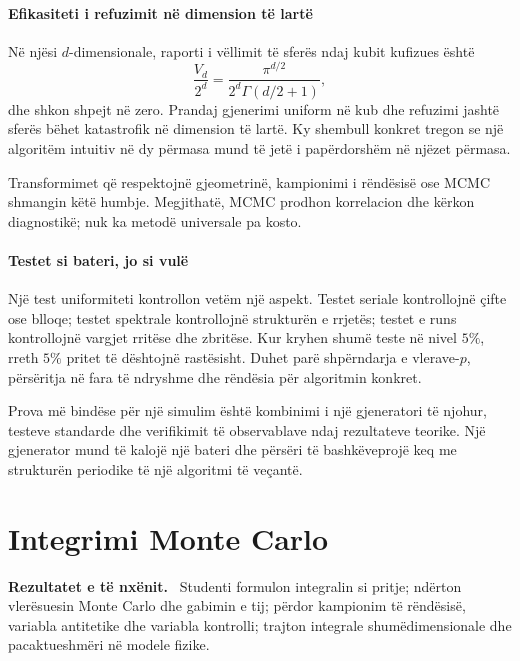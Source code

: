 \documentclass[11pt,oneside,openany]{book}
\newenvironment{qellime}{\par\medskip\noindent\textbf{Rezultatet e të nxënit.}\ }{\par\medskip}
\begin{document}
\subsubsection{Efikasiteti i refuzimit në dimension të lartë}
Në njësi $d$-dimensionale, raporti i vëllimit të sferës ndaj kubit kufizues është
\begin{equation}
 \frac{V_d}{2^d}=\frac{\pi^{d/2}}{2^d\Gamma(d/2+1)},
\end{equation}
dhe shkon shpejt në zero. Prandaj gjenerimi uniform në kub dhe refuzimi jashtë sferës bëhet katastrofik në dimension të lartë. Ky shembull konkret tregon se një algoritëm intuitiv në dy përmasa mund të jetë i papërdorshëm në njëzet përmasa.

Transformimet që respektojnë gjeometrinë, kampionimi i rëndësisë ose MCMC shmangin këtë humbje. Megjithatë, MCMC prodhon korrelacion dhe kërkon diagnostikë; nuk ka metodë universale pa kosto.

\subsubsection{Testet si bateri, jo si vulë}
Një test uniformiteti kontrollon vetëm një aspekt. Testet seriale kontrollojnë çifte ose blloqe; testet spektrale kontrollojnë strukturën e rrjetës; testet e runs kontrollojnë vargjet rritëse dhe zbritëse. Kur kryhen shumë teste në nivel $5\%$, rreth $5\%$ pritet të dështojnë rastësisht. Duhet parë shpërndarja e vlerave-$p$, përsëritja në fara të ndryshme dhe rëndësia për algoritmin konkret.

Prova më bindëse për një simulim është kombinimi i një gjeneratori të njohur, testeve standarde dhe verifikimit të observablave ndaj rezultateve teorike. Një gjenerator mund të kalojë një bateri dhe përsëri të bashkëveprojë keq me strukturën periodike të një algoritmi të veçantë.





\chapter{Integrimi Monte Carlo}
\begin{qellime}
Studenti formulon integralin si pritje; ndërton vlerësuesin Monte Carlo dhe gabimin e tij; përdor kampionim të rëndësisë, variabla antitetike dhe variabla kontrolli; trajton integrale shumëdimensionale dhe pacaktueshmëri në modele fizike.
\end{qellime}
\end{document}
